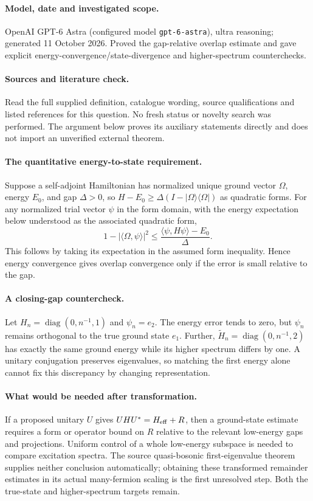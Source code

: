 \documentclass[11pt]{article}
\begin{document}
\paragraph{Model, date and investigated scope.}
OpenAI GPT-6 Astra (configured model \texttt{gpt-6-astra}), ultra reasoning; generated 11 October 2026. Proved the gap-relative overlap estimate and gave explicit energy-convergence/state-divergence and higher-spectrum counterchecks.

\paragraph{Sources and literature check.}
Read the full supplied definition, catalogue wording, source qualifications and listed references for this question. No fresh status or novelty search was performed. The argument below proves its auxiliary statements directly and does not import an unverified external theorem.

\paragraph{The quantitative energy-to-state requirement.} Suppose a self-adjoint Hamiltonian has normalized unique ground vector \(\Omega\), energy \(E_0\), and gap \(\Delta>0\), so \(H-E_0\geq\Delta(I-|\Omega\rangle\langle\Omega|)\) as quadratic forms. For any normalized trial vector \(\psi\) in the form domain, with the energy expectation below understood as the associated quadratic form,
\[
 1-|\langle\Omega,\psi\rangle|^2
 \leq\frac{\langle\psi,H\psi\rangle-E_0}{\Delta}.
\]
This follows by taking its expectation in the assumed form inequality. Hence energy convergence gives overlap convergence only if the error is small relative to the gap.
\paragraph{A closing-gap countercheck.} Let \(H_n=\operatorname{diag}(0,n^{-1},1)\) and \(\psi_n=e_2\). The energy error tends to zero, but \(\psi_n\) remains orthogonal to the true ground state \(e_1\). Further, \(\widetilde H_n=\operatorname{diag}(0,n^{-1},2)\) has exactly the same ground energy while its higher spectrum differs by one. A unitary conjugation preserves eigenvalues, so matching the first energy alone cannot fix this discrepancy by changing representation.
\paragraph{What would be needed after transformation.} If a proposed unitary \(U\) gives \(UHU^*=H_{\rm eff}+R\), then a ground-state estimate requires a form or operator bound on \(R\) relative to the relevant low-energy gaps and projections. Uniform control of a whole low-energy subspace is needed to compare excitation spectra. The source quasi-bosonic first-eigenvalue theorem supplies neither conclusion automatically; obtaining these transformed remainder estimates in its actual many-fermion scaling is the first unresolved step. Both the true-state and higher-spectrum targets remain.
\end{document}
